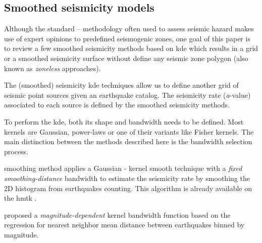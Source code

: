 \documentclass[draft, grl]{agutex}
\begin{document}
\begin{article}



\subsection{Smoothed seismicity models}

Although the standard \citet{cornell_1968}--\citet{mcguire_1976} methodology often used to assess seismic hazard makes use of expert opinions to predefined seismogenic zones, one goal of this paper is to review a few smoothed seismicity methods \citep{riznichenko_1959} based on \gls{kde} which results in a grid or a smoothed seismicity surface without define any seismic zone polygon (also known as \textit{zoneless} approaches).

The (smoothed) seismicity \gls{kde} techniques allow us to define another grid of seismic point sources given an earthquake catalog. The seismicity rate (\emph{a}-value) associated to each source is defined by the smoothed seismicity methods.

To perform the \gls{kde}, both its shape and bandwidth needs to be defined. Most kernels are Gaussian, power-laws or one of their variants like Fisher kernels. The main distinction between the methods described here is the bandwidth selection process.

\citet{frankel_1995} smoothing method applies a Gaussian \citet{nadaraya_1964}-\citet{watson_1964} kernel smooth technique with a \emph{fixed smoothing-distance} bandwidth to estimate the seismicity rate by smoothing the 2D histogram from earthquakes counting. This algorithm is already available on the \gls{hmtk} \citep{weatherill_2012, weatherill_2014_1}. 

\citet{woo_1996} proposed a \emph{magnitude-dependent} kernel bandwidth function based on the regression for nearest neighbor mean distance between earthquakes binned by magnitude.


\end{article}
\end{document}
